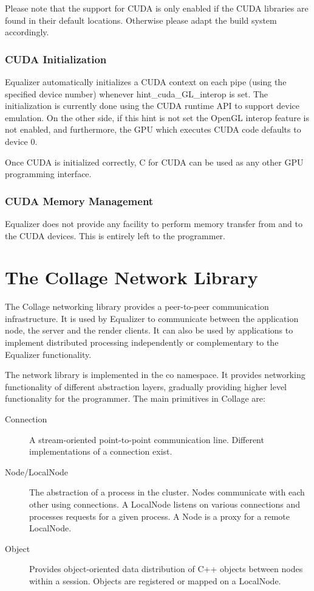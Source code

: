 \documentclass[10pt,a4]{scrartcl}
\begin{document}
Please note that the support for CUDA is only enabled if the CUDA libraries are
found in their default locations. Otherwise please adapt the build system
accordingly.

\subsubsection{CUDA Initialization}

Equalizer automatically initializes a CUDA context on each pipe (using the
specified device number) whenever \textsf{hint\_cuda\_GL\_interop} is set. The
initialization is currently done using the CUDA runtime API to support device
emulation. On the other side, if this hint is not set the OpenGL interop feature
is not enabled, and furthermore, the GPU which executes CUDA code defaults to
device 0.

Once CUDA is initialized correctly, C for CUDA can be used as any other GPU 
programming interface. 

\subsubsection{CUDA Memory Management}

Equalizer does not provide any facility to perform memory transfer from and to the CUDA
devices. This is entirely left to the programmer.

\section{\label{sNetwork}The Collage Network Library}

The Collage networking library provides a peer-to-peer communication
infrastructure. It is used by Equalizer to communicate between the application
node, the server and the render clients. It can also be used by applications to
implement distributed processing independently or complementary to the Equalizer
functionality.

The network library is implemented in the \textsf{co} namespace. It provides
networking functionality of different abstraction layers, gradually providing
higher level functionality for the programmer. The main primitives in Collage
are:

\begin{description}
\item[Connection] A stream-oriented point-to-point communication
  line. Different implementations of a connection exist.
\item[Node/LocalNode] The abstraction of a process in the cluster. Nodes
  communicate with each other using connections. A LocalNode listens on various
  connections and processes requests for a given process. A Node is a proxy for
  a remote LocalNode.
\item[Object] Provides object-oriented data distribution of C++ objects between
  nodes within a session. Objects are registered or mapped on a LocalNode.
\end{description}
\end{document}
